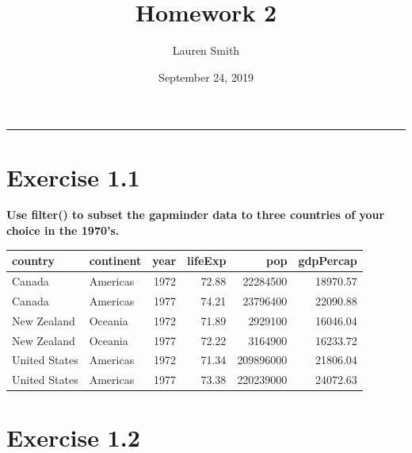 \documentclass[]{article}
\title{Homework 2}
\author{Lauren Smith}
\date{September 24, 2019}
\newenvironment{Shaded}{\begin{snugshade}}{\end{snugshade}}
\newcommand{\KeywordTok}[1]{\textcolor[rgb]{0.13,0.29,0.53}{\textbf{#1}}}
\newcommand{\NormalTok}[1]{#1}
\newcommand{\OperatorTok}[1]{\textcolor[rgb]{0.81,0.36,0.00}{\textbf{#1}}}
\newcommand{\StringTok}[1]{\textcolor[rgb]{0.31,0.60,0.02}{#1}}
\begin{document}
\maketitle

\begin{center}\rule{0.5\linewidth}{\linethickness}\end{center}

\hypertarget{exercise-1.1}{%
\section{Exercise 1.1}\label{exercise-1.1}}

\textbf{Use filter() to subset the gapminder data to three countries of
your choice in the 1970's.}

\begin{Shaded}
\end{Shaded}

\begin{longtable}[]{@{}llrrrr@{}}
\toprule
country & continent & year & lifeExp & pop & gdpPercap\tabularnewline
\midrule
\endhead
Canada & Americas & 1972 & 72.88 & 22284500 & 18970.57\tabularnewline
Canada & Americas & 1977 & 74.21 & 23796400 & 22090.88\tabularnewline
New Zealand & Oceania & 1972 & 71.89 & 2929100 & 16046.04\tabularnewline
New Zealand & Oceania & 1977 & 72.22 & 3164900 & 16233.72\tabularnewline
United States & Americas & 1972 & 71.34 & 209896000 &
21806.04\tabularnewline
United States & Americas & 1977 & 73.38 & 220239000 &
24072.63\tabularnewline
\bottomrule
\end{longtable}

\hypertarget{exercise-1.2}{%
\section{Exercise 1.2}\label{exercise-1.2}}
\end{document}
